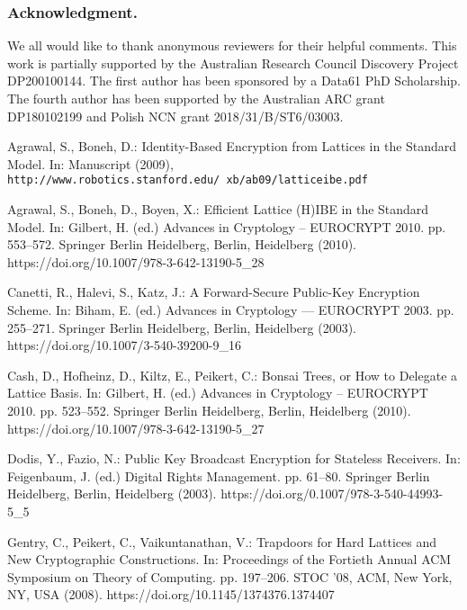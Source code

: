 \documentclass[runningheads]{llncs}
\begin{document}
\subsubsection{Acknowledgment.} 

We all would like to thank anonymous reviewers for their helpful comments.  This work is partially supported by the Australian Research Council Discovery Project DP200100144. The first author has been sponsored by a Data61 PhD Scholarship.  The fourth author has been supported by the Australian ARC grant DP180102199 and Polish NCN grant 2018/31/B/ST6/03003.


\begin{thebibliography}{10}
	\providecommand{\url}[1]{\texttt{#1}}
	\providecommand{\urlprefix}{URL }
	\providecommand{\doi}[1]{https://doi.org/#1}
	
	Agrawal, S., Boneh, D.: {Identity-Based Encryption from Lattices in the
		Standard Model}. In: Manuscript (2009),
	\url{http://www.robotics.stanford.edu/~xb/ab09/latticeibe.pdf}
	
	Agrawal, S., Boneh, D., Boyen, X.: {Efficient Lattice (H)IBE in the Standard
		Model}. In: Gilbert, H. (ed.) Advances in Cryptology -- EUROCRYPT 2010. pp.
	553--572. Springer Berlin Heidelberg, Berlin, Heidelberg (2010).
	\doi{10.1007/978-3-642-13190-5\_28}
	
	Canetti, R., Halevi, S., Katz, J.: {A Forward-Secure Public-Key Encryption
		Scheme}. In: Biham, E. (ed.) Advances in Cryptology --- EUROCRYPT 2003. pp.
	255--271. Springer Berlin Heidelberg, Berlin, Heidelberg (2003).
	\doi{10.1007/3-540-39200-9\_16}
	
	Cash, D., Hofheinz, D., Kiltz, E., Peikert, C.: {Bonsai Trees, or How to
		Delegate a Lattice Basis}. In: Gilbert, H. (ed.) Advances in Cryptology --
	EUROCRYPT 2010. pp. 523--552. Springer Berlin Heidelberg, Berlin, Heidelberg
	(2010). \doi{10.1007/978-3-642-13190-5\_27}
	
	Dodis, Y., Fazio, N.: {Public Key Broadcast Encryption for Stateless
		Receivers}. In: Feigenbaum, J. (ed.) Digital Rights Management. pp. 61--80.
	Springer Berlin Heidelberg, Berlin, Heidelberg (2003).
	\doi{0.1007/978-3-540-44993-5\_5}
	
	Gentry, C., Peikert, C., Vaikuntanathan, V.: {Trapdoors for Hard Lattices and
		New Cryptographic Constructions}. In: Proceedings of the Fortieth Annual ACM
	Symposium on Theory of Computing. pp. 197--206. STOC '08, ACM, New York, NY,
	USA (2008). \doi{10.1145/1374376.1374407}
	

\end{thebibliography}
\end{document}
